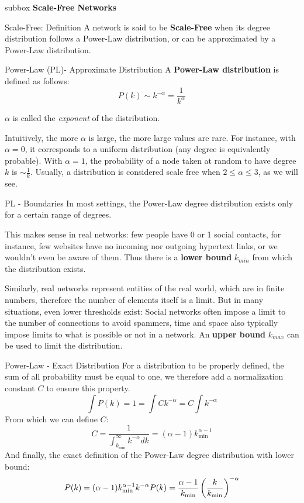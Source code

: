 \begin{subbox}{subbox}{}
    \centering
    \Large{\textbf{Scale-Free Networks}}
\end{subbox}

\begin{textbox}{Scale-Free: Definition}
    A network is said to be \textbf{Scale-Free} when its degree distribution follows a Power-Law distribution, or can be approximated by a Power-Law distribution.
\end{textbox}

\begin{textbox}{Power-Law (PL)- Approximate Distribution}
    A \textbf{Power-Law distribution} is defined as follows:
    \[
        P(k) \sim k^{-\alpha} = \frac{1}{k^\alpha}
    \]

    $\alpha$ is called the \textit{exponent} of the distribution.

    Intuitively, the more $\alpha$ is large, the more large values are rare. For instance, with $\alpha=0$, it corresponds to a uniform distribution (any degree is equivalently probable). With $\alpha=1$, the probability of a node taken at random to have degree $k$ is $\sim \frac{1}{k}$. Usually, a distribution is considered scale free when $2\leq \alpha\leq 3$, as we will see.
\end{textbox}


\begin{textbox}{PL - Boundaries}
    In most settings, the Power-Law degree distribution exists only for a certain range of degrees.

    This makes sense in real networks: few people have 0 or 1 social contacts, for instance, few websites have no incoming nor outgoing hypertext links, or we wouldn't even be aware of them. Thus there is a \textbf{lower bound} $k_{min}$ from which the distribution exists.

    Similarly, real networks represent entities of the real world, which are in finite numbers, therefore the number of elements itself is a limit. But in many situations, even lower thresholds exist: Social networks often impose a limit to the number of connections to avoid spammers, time and space also typically impose limits to what is possible or not in a network. An \textbf{upper bound} $k_{max}$ can be used to limit the distribution.
\end{textbox}


\begin{textbox}{Power-Law - Exact Distribution}
    For a distribution to be properly defined, the sum of all probability must be equal to one, we therefore add a normalization constant $C$ to ensure this property.
    \[
        \int P(k)=1= \int Ck^{-\alpha}=C\int k^{-\alpha}
    \]
    From which we can define $C$:
    \[
        C = \frac{1}{\int_{k_{\min}}^{\infty}k^{-\alpha} dk}=(\alpha-1)k_{\min}^{\alpha-1}
    \]
    And finally, the exact definition of the Power-Law degree distribution with lower bound:
    \[
        P(k) = (\alpha-1)k_{\min}^{\alpha-1}k^{-\alpha} \\
        P(k) = \frac{\alpha-1}{k_{\min}}\left(\frac{k}{k_{\min}}\right)^{-\alpha}
    \]
\end{textbox}

